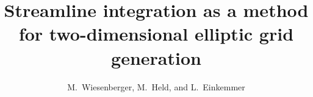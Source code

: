 \documentclass{hitec} %
\begin{document}

\title{Streamline integration as a method for two-dimensional elliptic grid generation}
\author{M.~Wiesenberger, M.~Held, and L.~Einkemmer}
 
\maketitle
\end{document}

